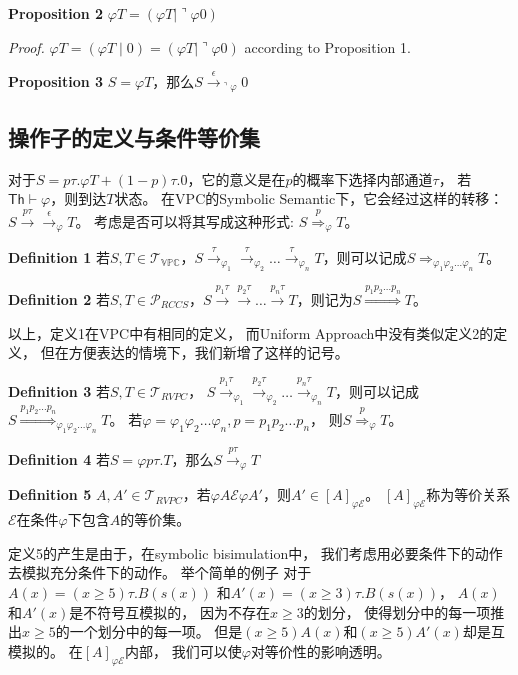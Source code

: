\textbf{Proposition 2} $\varphi T = (\varphi T\mid \urcorner \varphi 0)$

\textit{Proof.} $\varphi T = (\varphi T\mid 0) = (\varphi T\mid \urcorner \varphi 0)$ according to Proposition 1.

\textbf{Proposition 3} $S=\varphi T$，那么$S\stackrel{\epsilon}{\rightarrow}_{\urcorner \varphi} 0$

\subsection{操作子的定义与条件等价集}

对于$S = p\tau.\varphi T+(1-p)\tau.0$，它的意义是在$p$的概率下选择内部通道$\tau$，
若$\mathsf{Th}\vdash\varphi$，则到达$T$状态。
在VPC的Symbolic Semantic下，它会经过这样的转移：$S \stackrel{p\tau}{\rightarrow} \stackrel{\epsilon}{\rightarrow}_{\varphi} T$。
考虑是否可以将其写成这种形式: $S\stackrel{p}{\Rightarrow}_{\varphi} T$。

\textbf{Definition 1} 若$S,T\in \mathcal{T}_{\mathbb{VPC}}$，$S\stackrel{\tau}{\rightarrow}_{\varphi_1}\stackrel{\tau}{\rightarrow}_{\varphi_2}\dots \stackrel{\tau}{\rightarrow}_{\varphi_n} T$，则可以记成$S\stackrel{}{\Rightarrow}_{\varphi_1\varphi_2\dots\varphi_n} T$。

\textbf{Definition 2} 若$S,T\in \mathcal{P}_{RCCS}$，$S\stackrel{p_1\tau}{\rightarrow}\stackrel{p_2\tau}{\rightarrow}\dots\stackrel{p_n\tau}{\rightarrow}T$，则记为$S\stackrel{p_1p_2\dots p_n}{\Rightarrow}T$。

以上，定义1在VPC中有相同的定义，
而Uniform Approach中没有类似定义2的定义，
但在方便表达的情境下，我们新增了这样的记号。

\textbf{Definition 3} 若$S,T\in \mathcal{T}_{RVPC}$，
$S\stackrel{p_1\tau}{\rightarrow}_{\varphi_1}\stackrel{p_2\tau}{\rightarrow}_{\varphi_2}\dots \stackrel{p_n\tau}{\rightarrow}_{\varphi_n} T$，则可以记成$S\stackrel{p_1p_2\dots p_n}{\Rightarrow}_{\varphi_1\varphi_2\dots\varphi_n} T$。
若$\varphi = \varphi_1\varphi_2\dots \varphi_n, p=p_1p_2\dots p_n$，
则$S\stackrel{p}{\Rightarrow}_{\varphi} T$。

\textbf{Definition 4} 若$S=\varphi p\tau.T$，那么$S\stackrel{p\tau}{\rightarrow}_{\varphi} T$

 \textbf{Definition 5} $A,A'\in \mathcal{T}_{RVPC}$，若$\varphi A \mathcal{E} \varphi A'$，则$A'\in [A]_{\varphi \mathcal{E}}$。
 $[A]_{\varphi \mathcal{E}}$称为等价关系$\mathcal{E}$在条件$\varphi$下包含$A$的等价集。

 定义5的产生是由于，在symbolic bisimulation中，
 我们考虑用必要条件下的动作去模拟充分条件下的动作。
 举个简单的例子
 对于$A(x)=(x\geq 5)\tau.B(s(x))$
 和$A'(x)=(x\geq 3)\tau.B(s(x))$，
 $A(x)$和$A'(x)$是不符号互模拟的，
 因为不存在$x\geq 3$的划分，
 使得划分中的每一项推出$x\geq 5$的一个划分中的每一项。
 但是$(x\geq 5) A(x)$和$(x\geq 5) A'(x)$却是互模拟的。
 在$[A]_{\varphi \mathcal{E}}$内部，
 我们可以使$\varphi$对等价性的影响透明。

